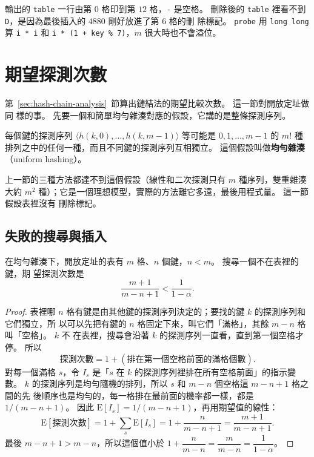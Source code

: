輸出的 \texttt{table} 一行由第 $0$ 格印到第 $12$ 格，\texttt{-} 是空格。 刪除後的
\texttt{table} 裡看不到 \texttt{D}，是因為最後插入的 $4880$ 剛好放進了第 $6$ 格的刪
除標記。 \texttt{probe} 用 \texttt{long long} 算 \texttt{i * i} 和
\texttt{i * (1 + key \% 7)}，$m$ 很大時也不會溢位。

\section{期望探測次數}
\label{sec:hash-analysis}

第~\ref{sec:hash-chain-analysis}~節算出鏈結法的期望比較次數。 這一節對開放定址做同
樣的事。 先要一個和簡單均勻雜湊對應的假設，它講的是整條探測序列。

\begin{definition}[均勻雜湊]
\label{def:hash-uh}
每個鍵的探測序列 $\langle h(k, 0), \ldots, h(k, m-1) \rangle$ 等可能是
$0, 1, \ldots, m-1$ 的 $m!$ 種排列之中的任何一種，而且不同鍵的探測序列互相獨立。
這個假設叫做\textbf{均勻雜湊}（uniform hashing）。
\end{definition}

上一節的三種方法都達不到這個假設（線性和二次探測只有 $m$ 種序列，雙重雜湊大約
$m^2$ 種）；它是一個理想模型，實際的方法離它多遠，最後用程式量。 這一節假設表裡沒有
刪除標記。

\subsection{失敗的搜尋與插入}

\begin{theorem}
\label{thm:hash-unsucc}
在均勻雜湊下，開放定址的表有 $m$ 格、$n$ 個鍵，$n < m$。 搜尋一個不在表裡的鍵，期
望探測次數是
\[
\frac{m + 1}{m - n + 1} < \frac{1}{1 - \alpha}.
\]
\end{theorem}

\begin{proof}
表裡哪 $n$ 格有鍵是由其他鍵的探測序列決定的；要找的鍵 $k$ 的探測序列和它們獨立，所
以可以先把有鍵的 $n$ 格固定下來，叫它們「滿格」，其餘 $m - n$ 格叫「空格」。 $k$ 不
在表裡，搜尋會沿著 $k$ 的探測序列一直看，直到第一個空格才停。 所以
\[
\text{探測次數} = 1 + (\text{排在第一個空格前面的滿格個數}).
\]
對每一個滿格 $s$，令 $I_s$ 是「$s$ 在 $k$ 的探測序列裡排在所有空格前面」的指示變數。
$k$ 的探測序列是均勻隨機的排列，所以 $s$ 和 $m - n$ 個空格這 $m - n + 1$ 格之間的先
後順序也是均勻的，每一格排在最前面的機率都一樣，都是 $1/(m - n + 1)$。 因此
$\mathrm{E}[I_s] = 1/(m - n + 1)$，再用期望值的線性：
\[
\mathrm{E}[\text{探測次數}] = 1 + \sum_{s} \mathrm{E}[I_s]
= 1 + \frac{n}{m - n + 1} = \frac{m + 1}{m - n + 1}.
\]
最後 $m - n + 1 > m - n$，所以這個值小於
$1 + \dfrac{n}{m - n} = \dfrac{m}{m - n} = \dfrac{1}{1 - \alpha}$。
\end{proof}

